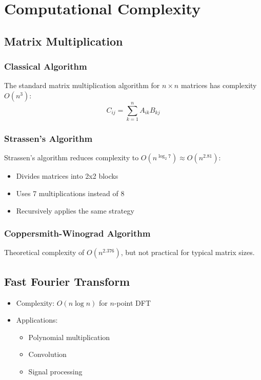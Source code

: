 \section{Computational Complexity}
\subsection{Matrix Multiplication}
\subsubsection{Classical Algorithm}
The standard matrix multiplication algorithm for $n \times n$ matrices has complexity $O(n^3)$:
\[
C_{ij} = \sum_{k=1}^n A_{ik} B_{kj}
\]

\subsubsection{Strassen's Algorithm}
Strassen's algorithm reduces complexity to $O(n^{\log_2 7}) \approx O(n^{2.81})$:
\begin{itemize}
    \item Divides matrices into 2x2 blocks
    \item Uses 7 multiplications instead of 8
    \item Recursively applies the same strategy
\end{itemize}

\subsubsection{Coppersmith-Winograd Algorithm}
Theoretical complexity of $O(n^{2.376})$, but not practical for typical matrix sizes.

\subsection{Fast Fourier Transform}
\begin{itemize}
    \item Complexity: $O(n \log n)$ for $n$-point DFT
    \item Applications:
        \begin{itemize}
            \item Polynomial multiplication
            \item Convolution
            \item Signal processing
        \end{itemize}
\end{itemize}

